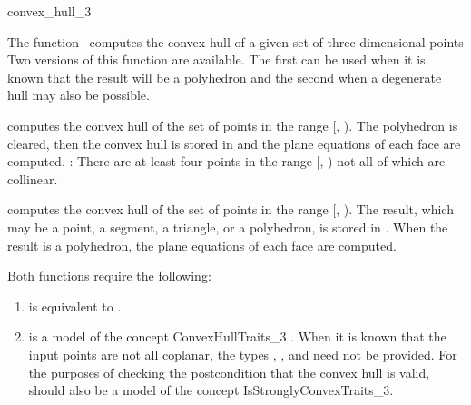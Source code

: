 \begin{ccRefFunction}{convex_hull_3}

\ccDefinition

The function \ccRefName\ computes the convex hull of a given set of 
three-dimensional points 
Two versions of this function 
are available.  The first can be used when it is known that the result
will be a polyhedron and the second when a degenerate hull
may also be possible.


{
computes the convex hull of the set of points in the range
[, ).  The polyhedron  is cleared, then
the convex hull is stored in  
and the plane equations of each face are computed.
\ccPrecond: There are at least four points in the range 
[, ) not all of which are collinear.
}

{
computes the convex hull of the set of points in the range
[, ).  The result, which may be a point, a segment,
a triangle, or a polyhedron, is stored in .  When
the result is a polyhedron, the plane equations of each face are computed.
}

Both functions require the following:
\begin{enumerate}
   \item {} is equivalent to .
   \item {} is a model of the concept ConvexHullTraits\_3
         .  When it is known that
         the input points are not all coplanar, the types , 
         , and  need not be provided.
         For the purposes of checking the postcondition that the convex hull
         is valid,  should also be a model of the concept
         IsStronglyConvexTraits\_3.
\end{enumerate}


\end{ccRefFunction}
